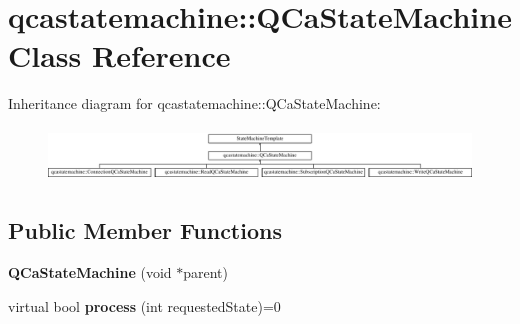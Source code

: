 \hypertarget{classqcastatemachine_1_1QCaStateMachine}{
\section{qcastatemachine::QCaStateMachine Class Reference}
\label{classqcastatemachine_1_1QCaStateMachine}
}
Inheritance diagram for qcastatemachine::QCaStateMachine:\begin{figure}[H]
\begin{center}
\leavevmode
\includegraphics[height=1.438356cm]{classqcastatemachine_1_1QCaStateMachine}
\end{center}
\end{figure}
\subsection*{Public Member Functions}
\begin{DoxyCompactItemize}
\item 
\hypertarget{classqcastatemachine_1_1QCaStateMachine_a7c058b5f8659184f47577ed019142045}{
{\bfseries QCaStateMachine} (void $\ast$parent)}
\label{classqcastatemachine_1_1QCaStateMachine_a7c058b5f8659184f47577ed019142045}

\item 
\hypertarget{classqcastatemachine_1_1QCaStateMachine_ae8a7bdb91cbbc0cbeda5bfc88cd6396d}{
virtual bool {\bfseries process} (int requestedState)=0}
\label{classqcastatemachine_1_1QCaStateMachine_ae8a7bdb91cbbc0cbeda5bfc88cd6396d}

\end{DoxyCompactItemize}
